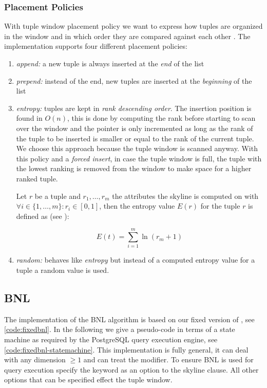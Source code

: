 \subsubsection{Placement Policies}
\label{sec:tuplewindowpolicies}
With tuple window placement policy we want to express how tuples are
organized in the window and in which order they are compared against
each other \citep{Godfrey2007}. The implementation supports four
different placement policies:
\begin{enumerate}
\item \emph{append:} 
a new tuple is always inserted at the \emph{end} of the list

\item \emph{prepend:}
instead of the end, new tuples are inserted at the \emph{beginning} of
the list

\item \emph{entropy:}
tuples are kept in \emph{rank descending order}. The insertion position
is found in $O(n)$, this is done by computing the rank before starting
to scan over the window and the pointer is only incremented as long as
the rank of the tuple to be inserted is smaller or equal to the rank
of the current tuple. We choose this approach because the tuple window
is scanned anyway. With this policy and a \emph{forced insert}, in
case the tuple window is full, the tuple with the lowest ranking is
removed from the window to make space for a higher ranked tuple.

Let $r$ be a tuple and $r_1, \ldots, r_m$ the attributes the skyline
is computed on with $\forall i \in \{1, \ldots, m\}\colon r_i \in [0,
1]$, then the entropy value $E(r)$ for the tuple $r$ is defined as
(see \citep{Chomicki2003,Chomicki2005}):

\begin{equation}\label{eqn:entropy}
E(t) = \sum_{i=1}^{m} \ln(r_m + 1)
\end{equation}

\item \emph{random: }
behaves like \emph{entropy} but instead of a computed entropy value
for a tuple a random value is used.

\end{enumerate}

\subsection{BNL}
The implementation of the BNL algorithm is based on our fixed version
of \citep{Borzsonyi2001}, see \autoref{code:fixedbnl}. In the
following we give a pseudo-code in terms of a state machine as
required by the PostgreSQL query execution engine, see
\autoref{code:fixedbnl-statemachine}. This implementation is fully general, it can deal with any dimension $\ge 1$ and can treat the  modifier. To ensure BNL is used for query execution specify the 
keyword as an option to the skyline clause.  All other options that
can be specified effect the tuple window.


